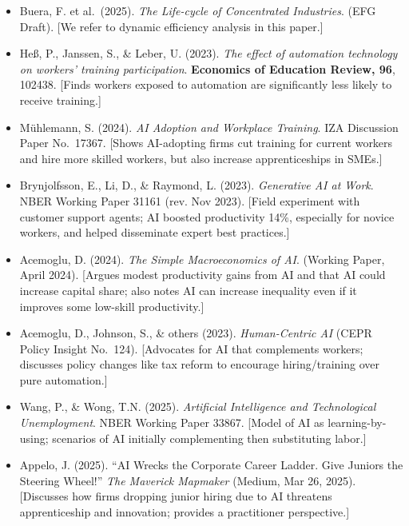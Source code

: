 \documentclass[12pt]{article}
\begin{document}
\begin{itemize}
\tightlist
\item
  Buera, F. et al.~(2025). \emph{The Life-cycle of Concentrated
  Industries}. (EFG Draft). {[}We refer to dynamic efficiency analysis
  in this paper.{]}
\item
  Heß, P., Janssen, S., \& Leber, U. (2023). \emph{The effect of
  automation technology on workers' training participation}.
  \textbf{Economics of Education Review, 96}, 102438. {[}Finds workers
  exposed to automation are significantly less likely to receive
  training.{]}
\item
  Mühlemann, S. (2024). \emph{AI Adoption and Workplace Training}. IZA
  Discussion Paper No.~17367. {[}Shows AI-adopting firms cut training
  for current workers and hire more skilled workers, but also increase
  apprenticeships in SMEs.{]}
\item
  Brynjolfsson, E., Li, D., \& Raymond, L. (2023). \emph{Generative AI
  at Work}. NBER Working Paper 31161 (rev. Nov 2023). {[}Field
  experiment with customer support agents; AI boosted productivity 14\%,
  especially for novice workers, and helped disseminate expert best
  practices.{]}
\item
  Acemoglu, D. (2024). \emph{The Simple Macroeconomics of AI}. (Working
  Paper, April 2024). {[}Argues modest productivity gains from AI and
  that AI could increase capital share; also notes AI can increase
  inequality even if it improves some low-skill productivity.{]}
\item
  Acemoglu, D., Johnson, S., \& others (2023). \emph{Human-Centric AI}
  (CEPR Policy Insight No.~124). {[}Advocates for AI that complements
  workers; discusses policy changes like tax reform to encourage
  hiring/training over pure automation.{]}
\item
  Wang, P., \& Wong, T.N. (2025). \emph{Artificial Intelligence and
  Technological Unemployment}. NBER Working Paper 33867. {[}Model of AI
  as learning-by-using; scenarios of AI initially complementing then
  substituting labor.{]}
\item
  Appelo, J. (2025). ``AI Wrecks the Corporate Career Ladder. Give
  Juniors the Steering Wheel!'' \emph{The Maverick Mapmaker} (Medium,
  Mar 26, 2025). {[}Discusses how firms dropping junior hiring due to AI
  threatens apprenticeship and innovation; provides a practitioner
  perspective.{]}
\end{itemize}
\end{document}

